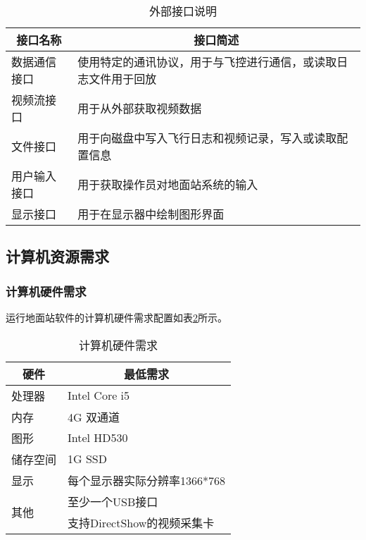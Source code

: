 \begin{table}[ht]
\centering
\caption{外部接口说明}
\label{t3int}
\begin{tabular}{|l|l|}
\hline
\multicolumn{1}{|c|}{接口名称} & \multicolumn{1}{c|}{接口简述}    \\ \hline
数据通信接口                     & 使用特定的通讯协议，用于与飞控进行通信，或读取日志文件用于回放 \\ \hline
视频流接口                      & 用于从外部获取视频数据                  \\ \hline
文件接口                       & 用于向磁盘中写入飞行日志和视频记录，写入或读取配置信息  \\ \hline
用户输入接口                     & 用于获取操作员对地面站系统的输入             \\ \hline
显示接口                       & 用于在显示器中绘制图形界面                \\ \hline
\end{tabular}
\end{table}
\subsection{计算机资源需求}
\subsubsection{计算机硬件需求}
运行地面站软件的计算机硬件需求配置如表\ref{t3req}所示。

\begin{table}[ht]
\centering
\caption{计算机硬件需求}
\label{t3req}
\begin{tabular}{|l|l|}
\hline
\multicolumn{1}{|c|}{硬件} & \multicolumn{1}{c|}{最低需求} \\ \hline
处理器                      & Intel Core i5             \\ \hline
内存                       & 4G 双通道                       \\ \hline
图形                       & Intel HD530               \\ \hline
储存空间                     & 1G SSD                    \\ \hline
显示                       & 每个显示器实际分辨率1366*768        \\ \hline
\multirow{2}{*}{其他}      & 至少一个USB接口                 \\ \cline{2-2} 
                         & 支持DirectShow的视频采集卡        \\ \hline
\end{tabular}
\end{table}

